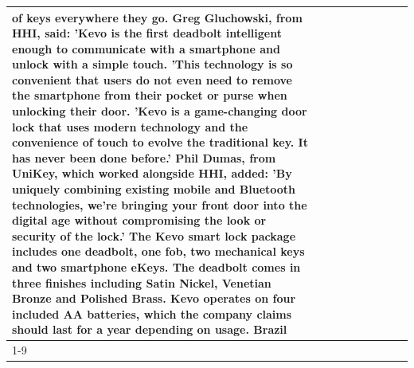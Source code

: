 \begin{table}[H]
\begin{tabular}{lllrlllll}
of keys everywhere they go. Greg Gluchowski, from HHI, said: 'Kevo is the first deadbolt intelligent enough to communicate with a smartphone and unlock with a simple touch. 'This technology is so convenient that users do not even need to remove the smartphone from their pocket or purse when unlocking their door. 'Kevo is a game-changing door lock that uses modern technology and the convenience of touch to evolve the traditional key. It has never been done before.' Phil Dumas, from UniKey, which worked alongside HHI, added: 'By uniquely combining existing mobile and Bluetooth technologies, we’re bringing your front door into the digital age without compromising the look or security of the lock.' The Kevo smart lock package includes one deadbolt, one fob, two mechanical keys and two smartphone eKeys. The deadbolt comes in three finishes including Satin Nickel, Venetian Bronze and Polished Brass. Kevo operates on four included AA batteries, which the company claims should last for a year depending on usage. Brazil \\
\cline{1-9}

\end{tabular}
\end{table}
